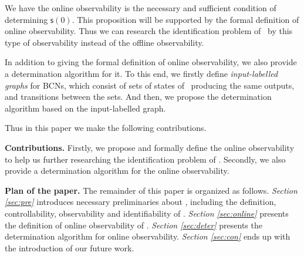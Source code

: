  We have the online observability is the necessary and sufficient condition of determining $\mathsf{s}(0)$. This proposition will be supported by the formal definition of  online observability.  Thus we can research the identification problem of \BCNs\ by this type of observability instead of the offline observability.




In addition to giving the formal definition of online observability, we also provide a determination algorithm for it. To this end, we firstly define {\em input-labelled graphs} for BCNs, which consist of sets of states of \BCNs\ producing the same outputs, and transitions between the sets. And then, we propose the determination algorithm based on the input-labelled graph.

Thus in this paper we make the following contributions.

\medskip\noindent
{\bf Contributions.}
Firstly, we propose and formally define the online observability to help us further researching the identification problem of \BCNs. %
Secondly, we also provide a determination algorithm for the online observability. %

\medskip\noindent
{\bf Plan of the paper.}
The remainder of this paper is organized as follows.
 {\em Section \ref{sec:pre}} introduces necessary preliminaries about \BCNs, including the definition, controllability, observability and identifiability of \BCNs. {\em Section \ref{sec:online}} presents the definition of online observability of \BCNs. {\em Section \ref{sec:deter}} presents the determination algorithm for online observability. 
 {\em Section \ref{sec:con}} ends up with the introduction of our future work.

